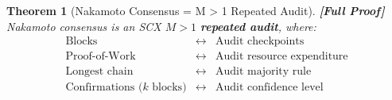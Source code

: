 \documentclass[12pt,a4paper]{article}
\newtheorem{theorem}{Theorem}[section]
\theoremstyle{remark}
\newcommand{\SCX}{\textsf{SCX}}
\newcommand{\rigorFull}{\textbf{[Full Proof]}}
\begin{document}
\begin{theorem}[Nakamoto Consensus = M > 1 Repeated Audit]
\label{thm:nakamoto_audit}
\rigorFull
Nakamoto consensus is an \SCX{} $M > 1$ \textbf{repeated audit}, where:
\begin{equation}
  \begin{array}{ccl}
    \text{Blocks} &\longleftrightarrow& \text{Audit checkpoints}\\[4pt]
    \text{Proof-of-Work} &\longleftrightarrow& \text{Audit resource expenditure}\\[4pt]
    \text{Longest chain} &\longleftrightarrow& \text{Audit majority rule}\\[4pt]
    \text{Confirmations ($k$ blocks)} &\longleftrightarrow& \text{Audit confidence level}
  \end{array}
\end{equation}
\end{theorem}
\end{document}
